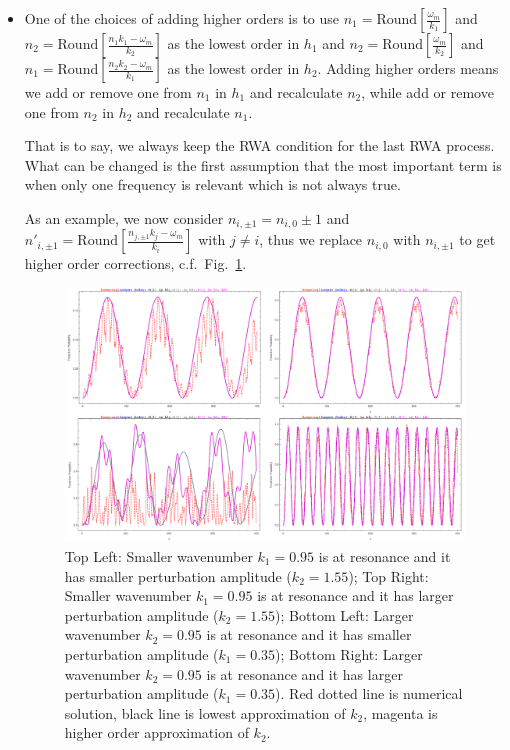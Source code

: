 \begin{itemize}
    \item One of the choices of adding higher orders is to use $n_1=\mathrm{Round}\left[ \frac{\omega_m}{k_1} \right]$ and $n_2=\mathrm{Round}\left[ \frac{ n_1  k_1 - \omega_m }{k_2} \right]$ as the lowest order in $h_1$ and $n_2=\mathrm{Round}\left[ \frac{\omega_m}{k_2} \right]$ and $n_1=\mathrm{Round}\left[ \frac{ n_2  k_2 - \omega_m }{k_1} \right]$ as the lowest order in $h_2$. Adding higher orders means we add or remove one from $n_1$ in $h_1$ and recalculate $n_2$, while add or remove one from $n_2$ in $h_2$ and recalculate $n_1$.

   That is to say, we always keep the RWA condition for the last RWA process. What can be changed is the first assumption that the most important term is when only one frequency is relevant which is not always true.

   As an example, we now consider $n_{i,\pm 1}=n_{i,0}\pm 1$ and $n'_{i,\pm 1} =  \mathrm{Round}\left[ \frac{ n_{j,\pm 1} k_j - \omega_m }{k_i} \right]$ with $j\neq i$, thus we replace $n_{i,0}$ with $n_{i,\pm 1}$ to get higher order corrections, c.f.~Fig.~\ref{chap:matter-sec:jacobi-subsec:multi-matter-freq-fig:compApproxNum}.


\begin{figure}[!htbp]
    \centering
    \includegraphics[width=\textwidth]{chapters/assets/rabi/compApproxNum.png}
    \caption{Top Left: Smaller wavenumber $k_1=0.95$ is at resonance and it has smaller perturbation amplitude ($k_2=1.55$);
      Top Right: Smaller wavenumber $k_1=0.95$ is at resonance and it has larger perturbation amplitude ($k_2=1.55$);
      Bottom Left: Larger wavenumber $k_2=0.95$ is at resonance and it has smaller perturbation amplitude ($k_1=0.35$);
      Bottom Right: Larger wavenumber $k_2=0.95$ is at resonance and it has larger perturbation amplitude ($k_1=0.35$).
      Red dotted line is numerical solution, black line is lowest approximation of $k_2$, magenta is higher order approximation of $k_2$.}
    \label{chap:matter-sec:jacobi-subsec:multi-matter-freq-fig:compApproxNum}
\end{figure}


\end{itemize}
